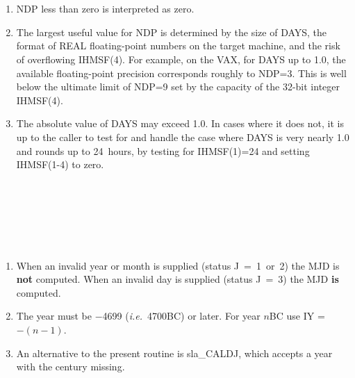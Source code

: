 {
}
{
  \\
}
{
  \\
}
\notes
{
 \begin{enumerate}
  \item NDP less than zero is interpreted as zero.
  \item The largest useful value for NDP is determined by the size of
        DAYS, the format of REAL floating-point numbers on the target
        machine, and the risk of overflowing IHMSF(4).  For example,
        on the VAX, for DAYS up to 1.0, the available floating-point
        precision corresponds roughly to NDP=3.  This is well below
        the ultimate limit of NDP=9 set by the capacity of the 32-bit
        integer IHMSF(4).
  \item The absolute value of DAYS may exceed 1.0.  In cases where it
        does not, it is up to the caller to test for and handle the
        case where DAYS is very nearly 1.0 and rounds up to 24~hours,
        by testing for IHMSF(1)=24 and setting IHMSF(1-4) to zero.
\end{enumerate}
}
{
}
{
}
{
  \\
  \\
  \\
  \\
  \\
}
\notes
{
 \begin{enumerate}
  \item When an invalid year or month is supplied (status J~=~1~or~2)
        the MJD is {\bf not} computed.  When an invalid day is supplied
        (status J~=~3) the MJD {\bf is} computed.
  \item The year must be $-$4699 ({\it i.e.}\ 4700BC) or later.
        For year $n$BC use IY = $-(n-1)$.
  \item An alternative to the present routine is sla\_CALDJ, which
        accepts a year with the century missing.
 \end{enumerate}
}
